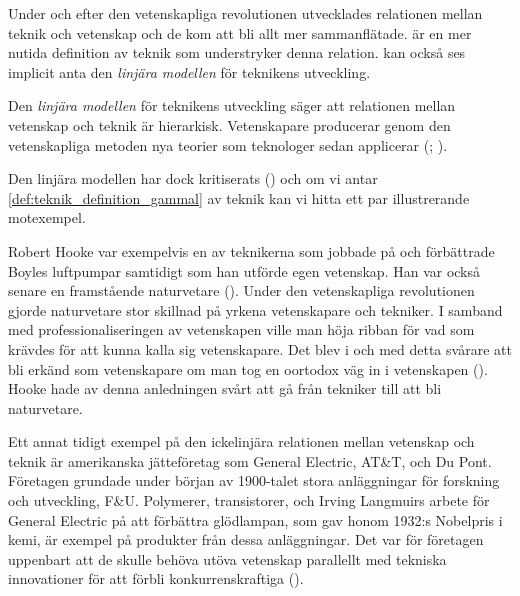 
Under och efter den vetenskapliga revolutionen utvecklades relationen mellan teknik och vetenskap och de kom att bli allt mer sammanflätade.  är en mer nutida definition av teknik som understryker denna relation.  kan också ses implicit anta den \emph{linjära modellen} för teknikens utveckling.
\begin{definition}
	Den \emph{linjära modellen} för teknikens utveckling säger att relationen mellan vetenskap och teknik är hierarkisk. Vetenskapare producerar genom den vetenskapliga metoden nya teorier som teknologer sedan applicerar (\cite[s.\ 391]{Bowler2005}; \cite[s.\ 15]{Lundgren2017}).
\end{definition}
Den linjära modellen har dock kritiserats (\cite[s.\ 18--23]{Lundgren2017}) och om vi antar \cref{def:teknik_definition_gammal} av teknik kan vi hitta ett par illustrerande motexempel.

Robert Hooke var exempelvis en av teknikerna som jobbade på och förbättrade Boyles luftpumpar samtidigt som han utförde egen vetenskap. Han var också senare en framstående naturvetare (\cite[s.\ 397--412]{Bowler2005}). Under den vetenskapliga revolutionen gjorde naturvetare stor skillnad på yrkena vetenskapare och tekniker. I samband med professionaliseringen av vetenskapen ville man höja ribban för vad som krävdes för att kunna kalla sig vetenskapare. Det blev i och med detta svårare att bli erkänd som vetenskapare om man tog en oortodox väg in i vetenskapen (\cite[s.\ 39--50]{Bowler2005}). Hooke hade av denna anledningen svårt att gå från tekniker till att bli naturvetare.%

Ett annat tidigt exempel på den ickelinjära relationen mellan vetenskap och teknik är amerikanska jätteföretag som General Electric, AT\&T, och Du Pont. Företagen grundade under början av 1900-talet stora anläggningar för forskning och utveckling, F\&U. Polymerer, transistorer, och Irving Langmuirs arbete för General Electric på att förbättra glödlampan, som gav honom 1932:s Nobelpris i kemi, är exempel på produkter från dessa anläggningar. Det var för företagen uppenbart att de skulle behöva utöva vetenskap parallellt med tekniska innovationer för att förbli konkurrenskraftiga (\cite{Smith1990}).

\bigskip

